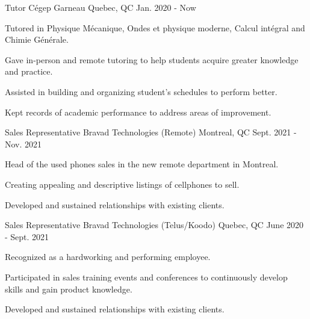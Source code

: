 

\begin{cventries}

  \cventry
    {Tutor} %
    {Cégep Garneau} %
    {Quebec, QC} %
    {Jan. 2020 - Now} %
    {
      \begin{cvitems} %
        \item {Tutored in Physique Mécanique, Ondes et physique moderne, Calcul intégral and Chimie Générale.}
        \item {Gave in-person and remote tutoring to help students acquire greater knowledge and practice.}
        \item {Assisted in building and organizing student's schedules to perform better.}
        \item {Kept records of academic performance to address areas of improvement.}
      \end{cvitems}
    }

  \cventry
    {Sales Representative} %
    {Bravad Technologies (Remote)} %
    {Montreal, QC} %
    {Sept. 2021 - Nov. 2021} %
    {
      \begin{cvitems} %
        \item {Head of the used phones sales in the new remote department in Montreal.}
        \item {Creating appealing and descriptive listings of cellphones to sell.}
        \item {Developed and sustained relationships with existing clients.}
      \end{cvitems}
    }

  \cventry
    {Sales Representative} %
    {Bravad Technologies (Telus/Koodo)} %
    {Quebec, QC} %
    {June 2020 - Sept. 2021} %
    {
      \begin{cvitems} %
        \item {Recognized as a hardworking and performing employee.}
        \item {Participated in sales training events and conferences to continuously develop skills and gain product knowledge.}
        \item {Developed and sustained relationships with existing clients.}
      \end{cvitems}
    }


\end{cventries}
